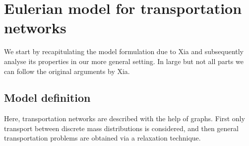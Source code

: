 \documentclass[10pt,a4paper,oneside,final]{article}
\numberwithin{equation}{section}
\theoremstyle{plain}
\theoremstyle{definition}
\theoremstyle{remark}
\begin{document}
\section{Eulerian model for transportation networks}\label{sec:Xia}

We start by recapitulating the model formulation due to Xia \cite{Xia-Optimal-Paths}
and subsequently analyse its properties in our more general setting.
In large but not all parts we can follow the original arguments by Xia.

\subsection{Model definition}

Here, transportation networks are described with the help of graphs.
First only transport between discrete mass distributions is considered, and then general transportation problems are obtained via a relaxation technique.
\end{document}
